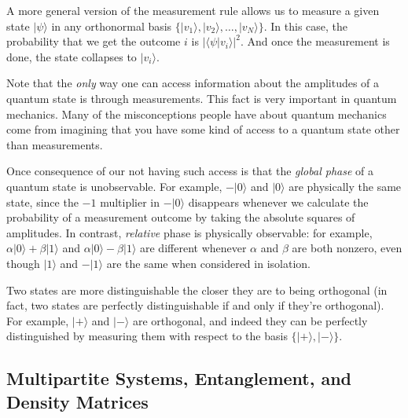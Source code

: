 \documentclass[11pt]{report}
\theoremstyle{plain}
\theoremstyle{definition}
\renewcommand{\ket}[1]{|#1\rangle}
\newcommand{\braket}[2]{\langle#1|#2\rangle}
\begin{document}
A more general version of the measurement rule allows us to measure a given state $\ket{\psi}$ in any orthonormal basis $\{\ket{v_1}, \ket{v_2}, \ldots, \ket{v_N}\}$. In this case, the probability that we get the outcome $i$ is $|\braket{\psi}{v_i}|^2$. And once the measurement is done, the state collapses to $\ket{v_i}$.

Note that the \emph{only} way one can access information about the amplitudes of a quantum state is through measurements. This fact is very important in quantum mechanics. Many of the misconceptions people have about quantum mechanics come from imagining that you have some kind of access to a quantum state other than measurements.

Once consequence of our not having such access is that the \emph{global phase} of a quantum state is unobservable. For example, $-\ket{0}$ and $\ket{0}$ are physically the same state, since the $-1$ multiplier in $-\ket{0}$ disappears whenever we calculate the probability of a measurement outcome by taking the absolute squares of amplitudes.  In contrast, \emph{relative} phase is physically observable: for example, $\alpha \ket{0}+\beta \ket{1}$ and $\alpha \ket{0}-\beta \ket{1}$ are different whenever $\alpha$ and $\beta$ are both nonzero, even though $\ket{1}$ and $-\ket{1}$ are the same when considered in isolation.

Two states are more distinguishable the closer they are to being orthogonal (in fact, two states are perfectly distinguishable if and only if they're orthogonal). For example, $\ket{+}$ and $\ket{-}$ are orthogonal, and indeed they can be perfectly distinguished by measuring them with respect to the basis $\{\ket{+}, \ket{-}\}$.


\subsection{Multipartite Systems, Entanglement, and Density Matrices}
\end{document}
